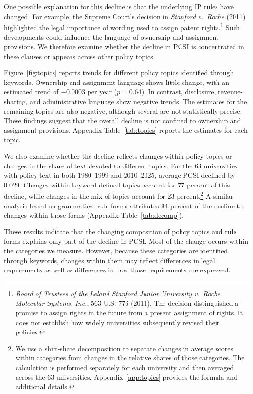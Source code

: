 \documentclass[11pt]{article}
\begin{document}
One possible explanation for this decline is that the underlying IP rules have changed. For example, the Supreme Court's decision in \emph{Stanford v.\ Roche} (2011) highlighted the legal importance of wording used to assign patent rights.\footnote{\emph{Board of Trustees of the Leland Stanford Junior University v.\ Roche Molecular Systems, Inc.}, 563 U.S. 776 (2011). The decision distinguished a promise to assign rights in the future from a present assignment of rights. It does not establish how widely universities subsequently revised their policies.} Such developments could influence the language of ownership and assignment provisions. We therefore examine whether the decline in PCSI is concentrated in these clauses or appears across other policy topics.

Figure~\ref{fig:topics} reports trends for different policy topics identified through keywords. Ownership and assignment language shows little change, with an estimated trend of $-0.0003$ per year ($p=0.64$). In contrast, disclosure, revenue-sharing, and administrative language show negative trends. The estimates for the remaining topics are also negative, although several are not statistically precise. These findings suggest that the overall decline is not confined to ownership and assignment provisions. Appendix Table~\ref{tab:topics} reports the estimates for each topic.

We also examine whether the decline reflects changes within policy topics or changes in the share of text devoted to different topics. For the 63 universities with policy text in both 1980--1999 and 2010--2025, average PCSI declined by 0.029. Changes within keyword-defined topics account for 77 percent of this decline, while changes in the mix of topics account for 23 percent.\footnote{We use a shift-share decomposition to separate changes in average scores within categories from changes in the relative shares of those categories. The calculation is performed separately for each university and then averaged across the 63 universities. Appendix~\ref{app:topics} provides the formula and additional details.} A similar analysis based on grammatical rule forms attributes 94 percent of the decline to changes within those forms (Appendix Table~\ref{tab:decomp}).

These results indicate that the changing composition of policy topics and rule forms explains only part of the decline in PCSI. Most of the change occurs within the categories we measure. However, because these categories are identified through keywords, changes within them may reflect differences in legal requirements as well as differences in how those requirements are expressed.
\end{document}
